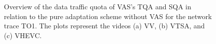 \begin{figure}[!htb]
 \centering
 \caption[Data traffic quota of using VAS's TQA and SQA]{Overview of the data traffic quota of VAS's TQA and SQA in relation to the pure adaptation scheme without VAS for the network trace TO1. The plots represent the videos %
  (a) VV, (b) VTSA, and (c) VHEVC.}%
 \label{fig:730_trafficReductionOverprovisioning}
\end{figure}

